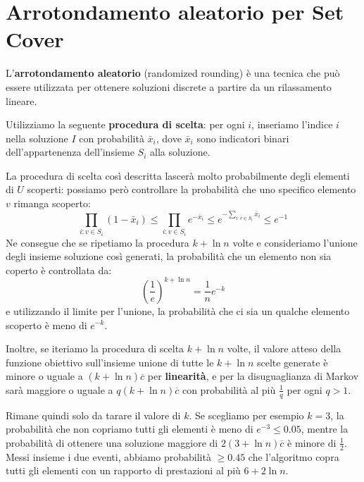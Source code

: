 \documentclass[\main/main.tex]{subfiles}
\begin{document}
\section{Arrotondamento aleatorio per Set Cover}
\begin{observation}
    L'\textbf{arrotondamento aleatorio} (randomized rounding) è una tecnica che può essere utilizzata per ottenere soluzioni discrete a partire da un rilassamento lineare.
\end{observation}
\begin{definition}
    Utilizziamo la seguente \textbf{procedura di scelta}: per ogni \(i\), inseriamo l'indice \(i\) nella soluzione \(I\) con probabilità \(\bar{x}_i\), dove \(\bar{x}_i\) sono indicatori binari dell'appartenenza dell'insieme \(S_i\) alla soluzione.
    
    La procedura di scelta così descritta lascerà molto probabilmente degli elementi di \(U\) scoperti: possiamo però controllare la probabilità che uno specifico elemento \(v\) rimanga scoperto:
    \[
        \prod_{i: v \in S_{i}}\left(1-\bar{x}_{i}\right) \leq \prod_{i: v \in S_{i}} e^{-\bar{x}_{i}} \leq e^{-\sum_{i: v \in S_{i}} \bar{x}_{i}} \leq e^{-1}
    \]
    Ne consegue che se ripetiamo la procedura \(k+\ln n\) volte e consideriamo l'unione degli insieme soluzione così generati, la probabilità che un elemento non sia coperto è controllata da:
    \[
        \left(\frac{1}{e}\right)^{k+\ln n}=\frac{1}{n} e^{-k}
    \]
    e utilizzando il limite per l'unione, la probabilità che ci sia un qualche elemento scoperto è meno di \(e^{-k}\).
    
    Inoltre, se iteriamo la procedura di scelta \(k+\ln n\) volte, il valore atteso della funzione obiettivo sull'insieme unione di tutte le \(k+\ln n\) scelte generate è minore o uguale a \((k+\ln n) \overline{c}\) per \textbf{linearità}, e per la disuguaglianza di Markov sarà maggiore o uguale a \(q(k+\ln n) \overline{c}\) con probabilità al più \(\frac{1}{q}\) per ogni \(q>1\).
    
    Rimane quindi solo da tarare il valore di \(k\). Se scegliamo per esempio \(k=3\), la probabilità che non copriamo tutti gli elementi è meno di \(e^{-3} \leq 0.05\), mentre la probabilità di ottenere una soluzione maggiore di \(2(3+\ln n) \overline{c}\) è minore di \(\frac{1}{2}\). Messi insieme i due eventi, abbiamo probabilità \(\geq 0.45\) che l'algoritmo copra tutti gli elementi con un rapporto di prestazioni al più \(6+2\ln n\).
\end{definition}
\clearpage
\end{document}
